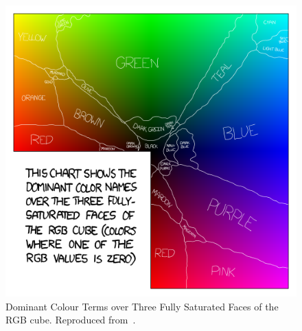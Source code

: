\begin{figure}[!hbt]\centering
\includegraphics[width=.6\textwidth]{image/general/xkcd.png}
\caption[Dominant Colour Terms over Three Fully Saturated Faces of the RGB cube.]{Dominant Colour Terms over Three Fully Saturated Faces of the RGB cube. Reproduced from~.}
\label{fig:xkcd}
\end{figure}


